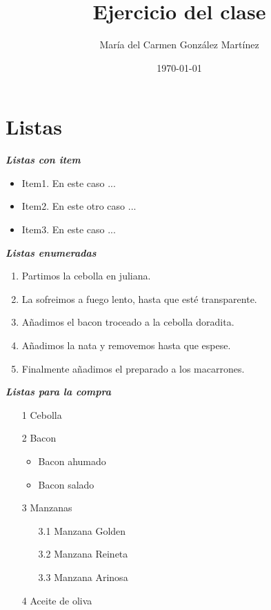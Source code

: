 \documentclass[10pt,a4paper]{book}
\author{María del Carmen González Martínez}
\title{{\Huge Ejercicio del clase} }
\date{\today}
\begin{document}
\maketitle


\tableofcontents

\newpage
\section{Listas}
\textbf{\textit{Listas con item}}
\begin{itemize}
\item Item1. En este caso ...
\item Item2. En este otro caso ...
\item Item3. En este caso ...
\end{itemize}


\textbf{\textit{Listas enumeradas}}
\begin{enumerate}
\item Partimos la cebolla en juliana.
\item La sofreimos a fuego lento, hasta que esté transparente.
\item Añadimos el bacon troceado a la cebolla doradita.
\item Añadimos la nata y removemos hasta que espese.
\item Finalmente añadimos el preparado a los macarrones. 
\end{enumerate}

\textbf{\textit{Listas para la compra}}
\begin{itemize}

\item[1] Cebolla

\item[2] Bacon 
\begin{itemize} 
	\item Bacon ahumado \item  Bacon salado
\end{itemize}

\item[3] Manzanas
  \begin{itemize}
	\item[3.1] Manzana Golden
	\item[3.2] Manzana Reineta
    \item[3.3] Manzana Arinosa
  \end{itemize}

\item[4] Aceite de oliva
\\
\end{itemize}
\end{document}
